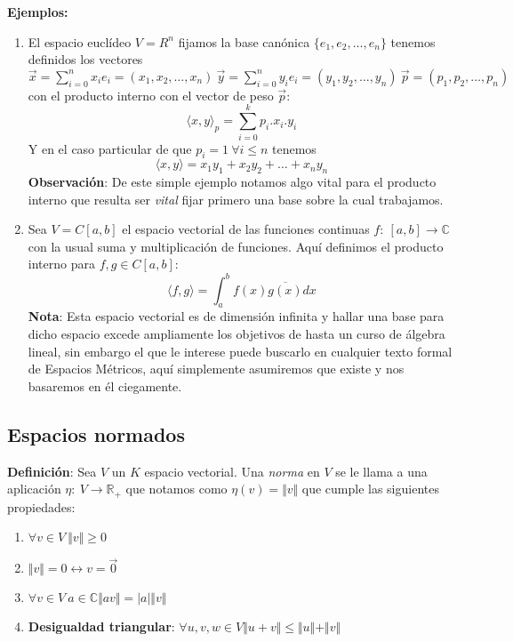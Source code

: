 \documentclass[a4paper,spanish]{article}
\def\C {\mathbb{C}}
\def\R {\mathbb{R}}
\numberwithin{equation}{section}
\begin{document}
\textbf{Ejemplos:}
\begin{enumerate}
\item El espacio eucl\'ideo $V=R^n$ fijamos la base can\'onica $\lbrace{e_1,e_2,\dots,e_n}\rbrace$ tenemos definidos los vectores $\vec{x}=\sum\limits_{i=0}^{n}{x_ie_i}=\left({x_1,x_2,\dots,x_n}\right) \ \vec{y}=\sum\limits_{i=0}^{n}{y_ie_i} = \left({y_1,y_2,\dots,y_n}\right) \ \vec{p}=\left({p_1,p_2,\dots,p_n}\right)$ con el producto interno con el vector de peso $\vec{p}$:
\[\langle{x,y}\rangle_{p}= \sum _{i=0}^{k}{p_i.x_i.y_i}\]
Y en el caso particular de que $p_i=1 \ \forall i\leq n$ tenemos
\[\langle{x,y}\rangle= x_1y_1+x_2y_2+\dots+x_ny_n\]
\textbf{Observaci\'on}: De este simple ejemplo notamos algo vital para el producto interno que resulta ser \emph{vital} fijar primero una base sobre la cual trabajamos.
\item Sea $V=C[a,b]$ el espacio vectorial de las funciones continuas $f: \ [a,b] \rightarrow \C$ con la usual suma y multiplicaci\'on de funciones. Aqu\'i definimos el producto interno para $f,g \in C[a,b]$:
\[\langle{f,g}\rangle = \int_a ^b {f\left({x}\right)\overline{g\left({x}\right)}} dx \]
\textbf{Nota}: Esta espacio vectorial es de dimensi\'on infinita y hallar una base para dicho espacio excede ampliamente los objetivos de hasta un curso de \'algebra lineal, sin embargo el que le interese puede buscarlo en cualquier texto formal de Espacios M\'etricos, aqu\'i simplemente asumiremos que existe y nos basaremos en \'el ciegamente.
\end{enumerate}

\subsection{Espacios normados}

\textbf{Definici\'on}: Sea $V$ un $K$ espacio vectorial. Una \textit{norma} en $V$ se le llama a una aplicaci\'on $\eta: \ V \rightarrow \R_{+}$ que notamos como $\eta \left({v}\right)= \Vert{v}\Vert$ que cumple las siguientes propiedades:
\begin{enumerate}
\item $\forall v \in V \ \Vert{v}\Vert \geq 0$
\item $\Vert{v}\Vert=0 \longleftrightarrow v=\vec{0}$
\item $\forall v \in V \ a\in \C \Vert{av}\Vert=\vert{a}\vert\Vert{v}\Vert$
\item \textbf{Desigualdad triangular}: $\forall u,v,w \in V \Vert{u+v}\Vert\leq\Vert{u}\Vert+\Vert{v}\Vert$
\end{enumerate}
\end{document}
